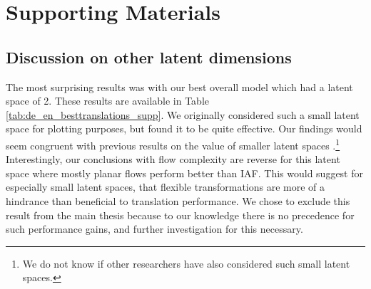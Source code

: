 \chapter{Supporting Materials}

\section{Discussion on other latent dimensions}

The most surprising results was with our best overall model which had a latent space of 2. These results are available in Table \ref{tab:de_en_besttranslations_supp}. We originally considered such a small latent space for plotting purposes, but found it to be quite effective. Our findings would seem congruent with previous results on the value of smaller latent spaces \cite{schulz2018StochasticDecoder}.\footnote{We do not know if other researchers have also considered such small latent spaces. } Interestingly, our conclusions with flow complexity are reverse for this latent space where mostly planar flows perform better than \ac{IAF}. This would suggest for especially small latent spaces, that flexible transformations are more of a hindrance than beneficial to translation performance. We chose to exclude this result from the main thesis because to our knowledge there is no precedence for such performance gains, and further investigation for this necessary. 

